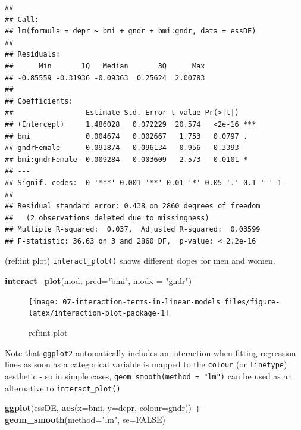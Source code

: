 \documentclass[
]{book}
\newenvironment{Shaded}{\begin{snugshade}}{\end{snugshade}}
\newcommand{\DataTypeTok}[1]{\textcolor[rgb]{0.13,0.29,0.53}{#1}}
\newcommand{\KeywordTok}[1]{\textcolor[rgb]{0.13,0.29,0.53}{\textbf{#1}}}
\newcommand{\NormalTok}[1]{#1}
\newcommand{\OperatorTok}[1]{\textcolor[rgb]{0.81,0.36,0.00}{\textbf{#1}}}
\newcommand{\OtherTok}[1]{\textcolor[rgb]{0.56,0.35,0.01}{#1}}
\newcommand{\StringTok}[1]{\textcolor[rgb]{0.31,0.60,0.02}{#1}}
\begin{document}
\begin{verbatim}
## 
## Call:
## lm(formula = depr ~ bmi + gndr + bmi:gndr, data = essDE)
## 
## Residuals:
##      Min       1Q   Median       3Q      Max 
## -0.85559 -0.31936 -0.09363  0.25624  2.00783 
## 
## Coefficients:
##                 Estimate Std. Error t value Pr(>|t|)    
## (Intercept)     1.486028   0.072229  20.574   <2e-16 ***
## bmi             0.004674   0.002667   1.753   0.0797 .  
## gndrFemale     -0.091874   0.096134  -0.956   0.3393    
## bmi:gndrFemale  0.009284   0.003609   2.573   0.0101 *  
## ---
## Signif. codes:  0 '***' 0.001 '**' 0.01 '*' 0.05 '.' 0.1 ' ' 1
## 
## Residual standard error: 0.438 on 2860 degrees of freedom
##   (2 observations deleted due to missingness)
## Multiple R-squared:  0.037,	Adjusted R-squared:  0.03599 
## F-statistic: 36.63 on 3 and 2860 DF,  p-value: < 2.2e-16
\end{verbatim}

(ref:int plot) \texttt{interact\_plot()} shows different slopes for men and women.

\begin{Shaded}
\begin{Highlighting}[]
\KeywordTok{interact_plot}\NormalTok{(mod, }\DataTypeTok{pred=}\StringTok{"bmi"}\NormalTok{, }\DataTypeTok{modx =} \StringTok{"gndr"}\NormalTok{)}
\end{Highlighting}
\end{Shaded}

\begin{figure}

{\centering \texttt{[image: 07-interaction-terms-in-linear-models\_files/figure-latex/interaction-plot-package-1]} 

}

\caption{ref:int plot}\label{fig:interaction-plot-package}
\end{figure}

Note that \texttt{ggplot2} automatically includes an interaction when fitting regression lines as soon as a categorical variable is mapped to the \texttt{colour} (or \texttt{linetype}) aesthetic - so in simple cases, \texttt{geom\_smooth(method\ =\ "lm")} can be used as an alternative to \texttt{interact\_plot()}

\begin{Shaded}
\begin{Highlighting}[]
\KeywordTok{ggplot}\NormalTok{(essDE, }\KeywordTok{aes}\NormalTok{(}\DataTypeTok{x=}\NormalTok{bmi, }\DataTypeTok{y=}\NormalTok{depr, }\DataTypeTok{colour=}\NormalTok{gndr)) }\OperatorTok{+}\StringTok{ }\KeywordTok{geom_smooth}\NormalTok{(}\DataTypeTok{method=}\StringTok{"lm"}\NormalTok{, }\DataTypeTok{se=}\OtherTok{FALSE}\NormalTok{)}
\end{Highlighting}
\end{Shaded}
\end{document}
